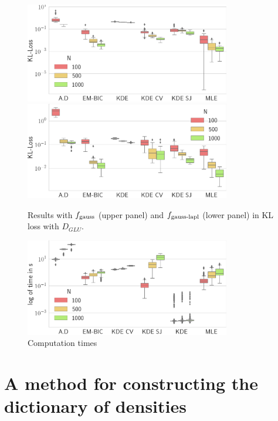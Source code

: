 \begin{figure}
\center
    \includegraphics[width=0.8\textwidth]{./TeX_files/res_gauss_KL_GLU.png}
    \includegraphics[width=0.8\textwidth]{./TeX_files/res_lapl_gauss_KL_GLU.png}
    \caption{Results with $f_{\textnormal{gauss}}$ (upper panel) and $f_{\textnormal{gauss-lapl}}$ 
    (lower panel) in KL loss with $D_{GLU}$.}
    \label{fig:res_ext_KL_GLU}
\end{figure} 


\begin{figure}
\center
    \includegraphics[width=0.8\textwidth]{./TeX_files/res_times.png}
    \caption{Computation times}
    \label{fig:res_times}
\end{figure}

\section{A method for constructing the dictionary of densities}
\label{sec:method_dict_gen}

